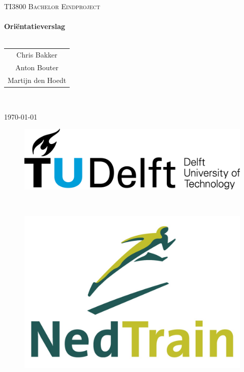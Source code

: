 


\begin{titlepage}
\center
\textsc{\huge TI3800 Bachelor Eindproject}\\[1.5cm]
\HRule \\[0.4cm]
{\Huge \bfseries Ori\"entatieverslag}\\[0.4cm]
\HRule \\[1.5cm]
\begin{Large}
\begin{tabular}{c}
Chris Bakker\\
Anton Bouter\\
Martijn den Hoedt\\
\end{tabular}\\[2cm]
\end{Large}

{\large \today}\\[2cm]

\begin{figure}[b]
\centering
\begin{minipage}{0.4\textwidth}
\begin{flushleft}
\includegraphics[width=0.9\linewidth]{../images/TU_Delft_logo.png}
\end{flushleft}
\end{minipage}
~
\begin{minipage}{0.4\textwidth}
\begin{flushright}
\includegraphics[width=0.9\linewidth]{../images/NedTrain_logo.png}
\end{flushright}
\end{minipage}\\[2cm]
\end{figure}

\vfill

\end{titlepage}

